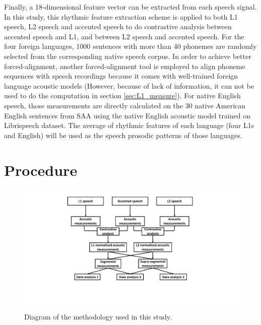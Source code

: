Finally, a 18-dimensional feature vector can be extracted from each speech signal. In this study, this rhythmic feature extraction scheme is applied to both L1 speech, L2 speech and accented speech to do contrastive analysis between accented speech and L1, and between L2 speech and accented speech. For the four foreign languages, 1000 sentences with more than 40 phonemes are randomly selected from the corresponding native speech corpus. In order to achieve better forced-alignment, another forced-alignment tool \citep{mcauliffe2017montreal} is employed to align phoneme sequences with speech recordings because it comes with well-trained foreign language acoustic models (However, because of lack of information, it can not be used to do the computation in section \ref{sec:L1_measure}). For native English speech, those measurements are directly calculated on the 30 native American English sentences from SAA using the native English acoustic model trained on Librispeech dataset. The average of rhythmic features of each language (four L1s and English) will be used as the speech prosodic patterns of those languages.

\section{Procedure}

 \begin{figure}[t]
\centering
\captionsetup{justification=centering}
\includegraphics[width = 0.8\linewidth]{figures/method_diagram.pdf}
\caption{Diagram of the methodology used in this study.}
\label{fig:method_diagram}
\end{figure}

